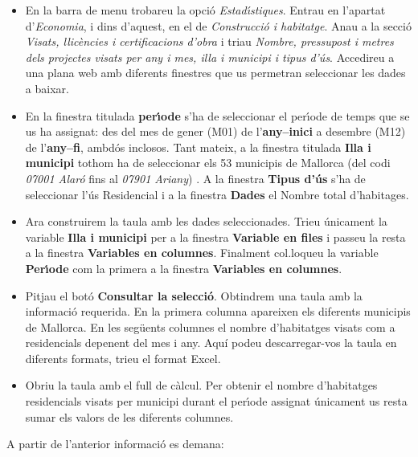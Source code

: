 \documentclass[11pt]{article}
\begin{document}
\begin{itemize}
\item [i)] En la barra de menu trobareu la opci\'o \textit{Estad\'{\i}stiques}. Entrau en l'apartat d'\textit{Economia}, i dins d'aquest, en el de \textit{Construcci\'o i habitatge}. 
Anau a la secci\'o \textit{Visats, llic\`encies i certificacions d'obra} i triau 
\textit{Nombre, pressupost i metres dels projectes visats per any i mes, illa i municipi i tipus d'\'us}. Accedireu a una plana web amb diferents finestres que us permetran seleccionar les dades a baixar.
\item [ii)] En la finestra titulada \textbf{per\'{\i}ode} s'ha de seleccionar el per\'{\i}ode de temps que se us ha assignat: des del mes de gener (M01) de l'\textbf{any--inici} a desembre (M12) de l'\textbf{any--fi}, ambd\'os inclosos. Tant mateix, a la finestra titulada \textbf{Illa i municipi} tothom ha de seleccionar els 53 municipis de Mallorca (del codi \textit{07001 Alar\'o} fins al \textit{07901 Ariany}) . A la finestra \textbf{Tipus d'\'us} s'ha de seleccionar l'\'us Residencial i a la finestra \textbf{Dades} el Nombre total d'habitages.
\item [iii)] Ara construirem la taula amb les dades seleccionades. Trieu \'unicament la variable \textbf{Illa i municipi} per a la finestra \textbf{Variable en files} i passeu la resta a la finestra \textbf{Variables en columnes}. Finalment col.loqueu la variable \textbf{Per\'{\i}ode} com la primera a la finestra \textbf{Variables en columnes}.
\item [iv)] Pitjau el bot\'o \textbf{Consultar la selecci\'o}. Obtindrem una taula amb la informaci\'o requerida. En la primera columna apareixen els diferents municipis de Mallorca. En les seg\"uents columnes el nombre d'habitatges visats com a residencials depenent del mes i any. Aqu\'i podeu descarregar-vos la taula en diferents formats, trieu el format Excel.
\item [v)] Obriu la taula amb el full de c\`alcul. Per obtenir el nombre d'habitatges residencials visats per municipi durant el per\'{\i}ode assignat \'unicament us resta sumar els valors de les diferents columnes. 
\end{itemize}

A partir de l'anterior informaci\'o es demana:
\end{document}
